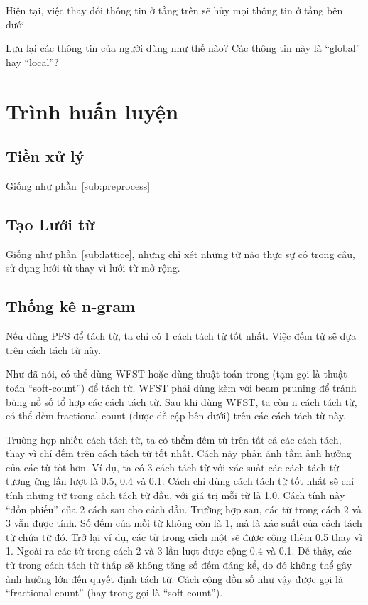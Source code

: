 \documentclass[a4paper,oneside]{book} %
\theoremstyle{break}
\begin{document}
Hiện tại, việc thay đổi thông tin ở tầng trên sẽ hủy mọi thông tin ở
tầng bên dưới.

Lưu lại các thông tin của người dùng như thế nào? Các thông tin này là
``global'' hay ``local''?

\section{Trình huấn luyện}
\label{sec:training}

\subsection{Tiền xử lý}
Giống như phần~\ref{sub:preprocess}


\subsection{Tạo Lưới từ}
Giống như phần~\ref{sub:lattice}, nhưng chỉ xét những từ nào thực sự
có trong câu, sử dụng lưới từ thay vì lưới từ mở rộng.


\subsection{Thống kê n-gram}
\label{sub:wordcount}

Nếu dùng PFS để tách từ, ta chỉ có 1 cách tách từ tốt nhất. Việc đếm
từ sẽ dựa trên cách tách từ này.

Như đã nói, có thể dùng WFST hoặc dùng thuật toán trong
\cite{softcount} (tạm gọi là thuật toán ``soft-count'') để tách
từ. WFST phải dùng kèm với beam pruning để tránh bùng nổ số tổ hợp các
cách tách từ. Sau khi dùng WFST, ta còn n cách tách từ, có thể đếm
fractional count (được đề cập bên dưới) trên các cách tách từ này.

Trường hợp nhiều cách tách từ, ta có thểm đếm từ trên tất cả các cách
tách, thay vì chỉ đếm trên cách tách từ tốt nhất. Cách này phản ánh
tầm ảnh hưởng của các từ tốt hơn. Ví dụ, ta có 3 cách tách từ với xác
suất các cách tách từ tương ứng lần lượt là 0.5, 0.4 và 0.1. Cách chỉ
dùng cách tách từ tốt nhất sẽ chỉ tính những từ trong cách tách từ
đầu, với giá trị mỗi từ là 1.0. Cách tính này ``dồn phiếu'' của 2 cách
sau cho cách đầu. Trường hợp sau, các từ trong cách 2 và 3 vẫn được
tính. Số đếm của mỗi từ không còn là 1, mà là xác suất của cách tách
từ chứa từ đó. Trở lại ví dụ, các từ trong cách một sẽ được cộng thêm
0.5 thay vì 1. Ngoài ra các từ trong cách 2 và 3 lần lượt được cộng
0.4 và 0.1. Dễ thấy, các từ trong cách tách từ thấp sẽ không tăng số
đếm đáng kể, do đó không thể gây ảnh hưởng lớn đến quyết định tách từ.
Cách cộng dồn số như vậy được gọi là ``fractional count'' (hay trong
\cite{softcount} gọi là ``soft-count'').
\end{document}

